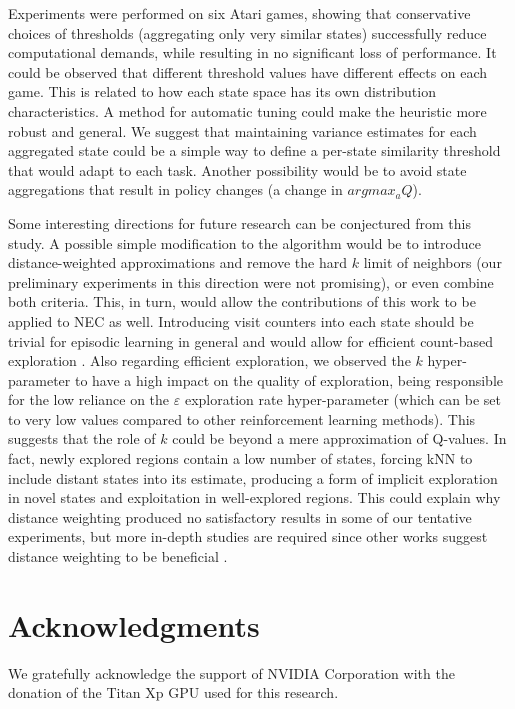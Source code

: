 \documentclass{article}
\begin{document}
Experiments were performed on six Atari games, showing that conservative choices of thresholds (aggregating only very similar states) successfully reduce computational demands, while resulting in no significant loss of performance. It could be observed that different threshold values have different effects on each game. This is related to how each state space has its own distribution characteristics. A method for automatic tuning could make the heuristic more robust and general. We suggest that maintaining variance estimates for each aggregated state could be a simple way to define a per-state similarity threshold that would adapt to each task. Another possibility would be to avoid state aggregations that result in policy changes (a change in $argmax_a Q$). 

Some interesting directions for future research can be conjectured from this study. A possible simple modification to the algorithm would be to introduce distance-weighted approximations and remove the hard $k$ limit of neighbors (our preliminary experiments in this direction were not promising), or even combine both criteria. This, in turn, would allow the contributions of this work to be applied to NEC as well. Introducing visit counters into each state should be trivial for episodic learning in general and would allow for efficient count-based exploration \cite{bellemare2016unifying}. Also regarding efficient exploration, we observed the $k$ hyper-parameter to have a high impact on the quality of exploration, being responsible for the low reliance on the $\varepsilon$ exploration rate hyper-parameter (which can be set to very low values compared to other reinforcement learning methods). This suggests that the role of $k$ could be beyond a mere approximation of Q-values. In fact, newly explored regions contain a low number of states, forcing kNN to include distant states into its estimate, producing a form of implicit exploration in novel states and exploitation in well-explored regions. This could explain why distance weighting produced no satisfactory results in some of our tentative experiments, but more in-depth studies are required since other works suggest distance weighting to be beneficial \cite{agostinelli2019memory}. 

\section*{Acknowledgments}

We gratefully acknowledge the support of NVIDIA Corporation with the donation of the Titan Xp GPU used for this research.

  
  
\end{document}
